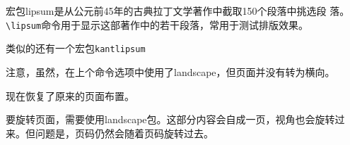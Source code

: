 \documentclass[a4paper]{article}
\begin{document}
宏包lipsum是从公元前45年的古典拉丁文学著作中截取150个段落中挑选段
落。\verb!\lipsum!命令用于显示这部著作中的若干段落，常用于测试排版效果。

类似的还有一个宏包\verb!kantlipsum!

\lipsum[1-3]


注意，虽然，在上个命令选项中使用了landscape，但页面并没有转为横向。
\lipsum[1-3]

\restoregeometry

现在恢复了原来的页面布置。

\lipsum[1-3]

\begin{landscape}
\pagestyle{empty}%
  要旋转页面，需要使用landscape包。这部分内容会自成一页，视角也会旋转过
  来。但问题是，页码仍然会随着页码旋转过去。
\end{landscape}
\pagestyle{plain}%

\restoregeometry

\kant[1-3]
\end{document}
